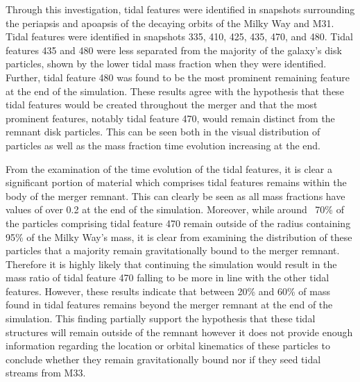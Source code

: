 \documentclass[fleqn,usenatbib]{mnras}
\begin{document}
Through this investigation, tidal features were identified in snapshots surrounding the periapsis and apoapsis of the decaying orbits of the Milky Way and M31. Tidal features were identified in snapshots 335, 410, 425, 435, 470, and 480. Tidal features 435 and 480 were less separated from the majority of the galaxy's disk particles, shown by the lower tidal mass fraction when they were identified. Further, tidal feature 480 was found to be the most prominent remaining feature at the end of the simulation. These results agree with the hypothesis that these tidal features would be created throughout the merger and that the most prominent features, notably tidal feature 470, would remain distinct from the remnant disk particles. This can be seen both in the visual distribution of particles as well as the mass fraction time evolution increasing at the end. 

From the examination of the time evolution of the tidal features, it is clear a significant portion of material which comprises tidal features remains within the body of the merger remnant. This can clearly be seen as all mass fractions have values of over 0.2 at the end of the simulation. Moreover, while around ~70\% of the particles comprising tidal feature 470 remain outside of the radius containing 95\% of the Milky Way's mass, it is clear from examining the distribution of these particles that a majority remain gravitationally bound to the merger remnant. Therefore it is highly likely that continuing the simulation would result in the mass ratio of tidal feature 470 falling to be more in line with the other tidal features. However, these results indicate that between 20\% and 60\% of mass found in tidal features remains beyond the merger remnant at the end of the simulation. This finding partially support the hypothesis that these tidal structures will remain outside of the remnant however it does not provide enough information regarding the location or orbital kinematics of these particles to conclude whether they remain gravitationally bound nor if they seed tidal streams from M33. 
\end{document}
